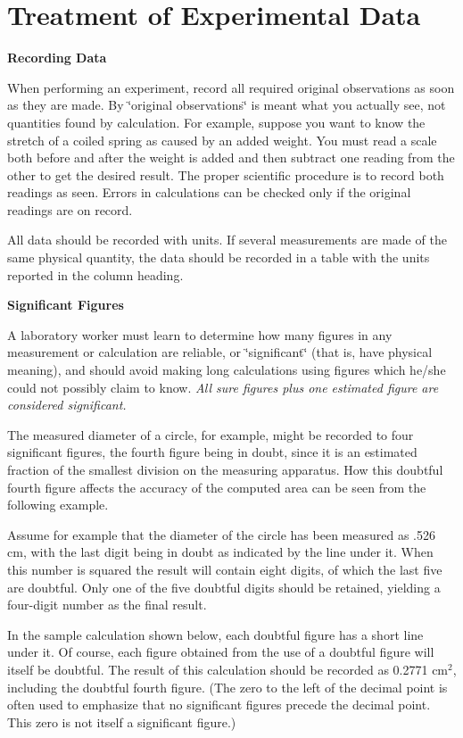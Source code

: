 \appendix


\section{Treatment of Experimental Data}

\textbf{Recording Data }

When performing an experiment, record all required original observations
as soon as they are made. By \char`\"{}original observations\char`\"{}
is meant what you actually see, not quantities found by calculation.
For example, suppose you want to know the stretch of a coiled spring
as caused by an added weight. You must read a scale both before and
after the weight is added and then subtract one reading from the other
to get the desired result. The proper scientific procedure is to record
both readings as seen. Errors in calculations can be checked only
if the original readings are on record.

All data should be recorded with units. If several measurements are
made of the same physical quantity, the data should be recorded in
a table with the units reported in the column heading.

\textbf{Significant Figures} 

A laboratory worker must learn to determine how many figures in any
measurement or calculation are reliable, or \char`\"{}significant\char`\"{}
(that is, have physical meaning), and should avoid making long calculations
using figures which he/she could not possibly claim to know. \textit{All
sure figures plus one estimated figure are considered significant.}

The measured diameter of a circle, for example, might be recorded
to four significant figures, the fourth figure being in doubt, since
it is an estimated fraction of the smallest division on the measuring
apparatus. How this doubtful fourth figure affects the accuracy of
the computed area can be seen from the following example.

Assume for example that the diameter of the circle has been measured
as .526 cm, with the last digit being in doubt as indicated by the
line under it. When this number is squared the result will contain
eight digits, of which the last five are doubtful. Only one of the
five doubtful digits should be retained, yielding a four-digit number
as the final result.

In the sample calculation shown below, each doubtful figure has a
short line under it. Of course, each figure obtained from the use
of a doubtful figure will itself be doubtful. The result of this calculation
should be recorded as 0.2771 cm\( ^{2} \), including the doubtful
fourth figure. (The zero to the left of the decimal point is often
used to emphasize that no significant figures precede the decimal
point. This zero is not itself a significant figure.)

